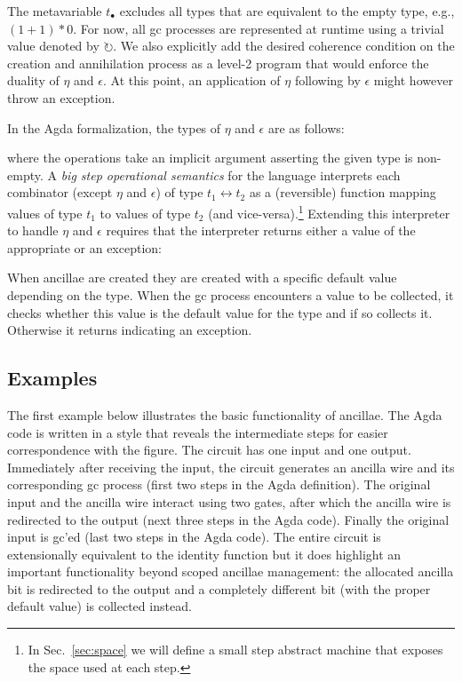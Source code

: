 \documentclass[sigplan,10pt,review,anonymous]{acmart}
\newcommand{\net}{t_\bullet}
\newcommand{\gcv}{\circlearrowright}
\begin{document}
The metavariable $\net$ excludes all types that are equivalent to the
empty type, e.g., $(1 + 1) * 0$. For now, all gc processes are
represented at runtime using a trivial value denoted by $\gcv$. We
also explicitly add the desired coherence condition on the creation
and annihilation process as a level-2 program that would enforce the
duality of $\eta$ and $\epsilon$. At this point, an application of
$\eta$ following by $\epsilon$ might however throw an exception.

In the Agda formalization, the types of $\eta$ and $\epsilon$ are as follows:

\EtaEpsilon{}

\noindent where the operations take an implicit argument asserting the
given type is non-empty. A \emph{big step operational semantics} for
the language interprets each combinator (except $\eta$ and $\epsilon$)
of type $t_1 \leftrightarrow t_2$ as a (reversible) function mapping
values of type $t_1$ to values of type $t_2$ (and
vice-versa).\footnote{In Sec.~\ref{sec:space} we will define a small
  step abstract machine that exposes the space used at each step.}
Extending this interpreter to handle $\eta$ and $\epsilon$ requires
that the interpreter returns either a value of the appropriate or an
exception:

\dyninterp{}

When ancillae are created they are created with a specific default
value depending on the type. When the gc process encounters a value to
be collected, it checks whether this value is the default value for
the type and if so collects it. Otherwise it returns
 indicating an exception.

\subsection{Examples}
\label{sub:id}

The first example below illustrates the basic functionality of
ancillae. The Agda code is written in a style that reveals the
intermediate steps for easier correspondence with the figure. The
circuit has one input and one output. Immediately after receiving the
input, the circuit generates an ancilla wire and its corresponding gc
process (first two steps in the Agda definition). The original input
and the ancilla wire interact using two  gates,
after which the ancilla wire is redirected to the output (next three
steps in the Agda code). Finally the original input is gc'ed (last two
steps in the Agda code). The entire circuit is extensionally
equivalent to the identity function but it does highlight an important
functionality beyond scoped ancillae management: the allocated ancilla
bit is redirected to the output and a completely different bit (with
the proper default value) is collected instead.
\end{document}
